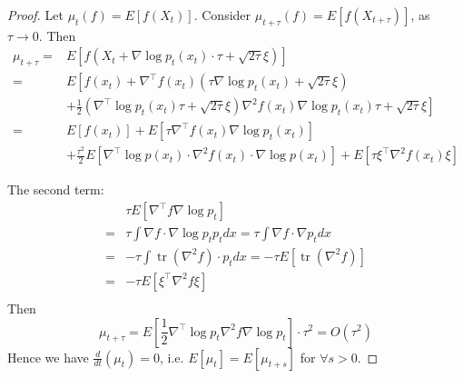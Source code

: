 \documentclass{article}
\newtheorem{proof}{Proof}
\begin{document}
\begin{proof}
    Let  $\mu_{t}(f)=E\left[f\left(X_{t}\right)\right]$. Consider  $\mu_{t+\tau}(f)=E\left[f\left(X_{t+\tau}\right)\right]$, as $\tau \rightarrow 0$. Then  
\begin{equation}
    \begin{aligned}
        \mu_{t+\tau}=&E\left[f\left(X_{t}+\nabla \log p_t\left(x_{t}\right) \cdot \tau+\sqrt{2 \tau} \xi\right)\right]\\
        =&E\left[f\left(x_{t}\right)+\nabla^{\top} f\left(x_{t}\right)\left(\tau \nabla \log p_t\left(x_{t}\right)+\sqrt{2 \tau} \xi\right)\right. \\
        &+\frac{1}{2}\left.\left(\nabla^{\top}\log p_t(x_t)\tau + \sqrt{2\tau}\xi\right)\nabla^2f(x_t)\nabla\log p_t(x_t)\tau + \sqrt{2\tau}\xi\right]\\
        =&E\left[f\left(x_{t}\right)\right]+E\left[\tau \nabla^{\top}f\left(x_{t}\right) \nabla \log p_t\left(x_{t}\right)\right]\\
        &+\frac{\tau^{2}}{2} E\left[\nabla^{\top} \log p\left(x_{t}\right) \cdot \nabla^{2} f\left(x_{t}\right) \cdot \nabla \log p\left(x_{t}\right)\right] +E\left[\tau \xi^{\top} \nabla^{2} f\left(x_{t}\right) \xi\right]
    \end{aligned}
\end{equation}
 
The second term:
\begin{equation}
    \begin{aligned}
        &\tau E\left[\nabla^{\top} f \nabla \log p_{t}\right] \\
        =&\tau \int \nabla f \cdot \nabla \log p_{t} p_{t} d x=\tau \int \nabla f \cdot \nabla p_{t} d x \\
        =&-\tau \int \operatorname{tr}\left(\nabla^{2} f\right) \cdot p_{t} d x=-\tau E\left[\operatorname{tr}\left(\nabla^{2} f\right)\right]\\
        =&-\tau E\left[\xi^{\top} \nabla^{2} f \xi\right] \\
    \end{aligned}
\end{equation}
Then 
\begin{equation}
    \mu_{t+\tau} =E\left[\frac{1}{2} \nabla^{\top} \log p_{t} \nabla^{2} f \nabla \log p_{t}\right] \cdot \tau^{2}=O\left(\tau^{2}\right)
\end{equation}
Hence we have $\frac{d}{dt}(\mu_t)=0$, i.e. $E[\mu_t]=E[\mu_{t+s}]$ for $\forall s>0$.
\end{proof}
\end{document}
